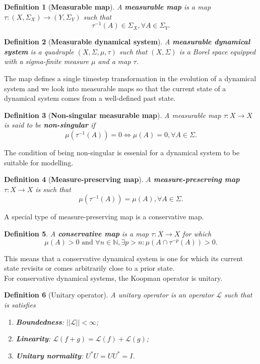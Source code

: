 \documentclass[]{article}
\newtheorem{definition}{Definition}
\begin{document}
\begin{definition}[\textbf{Measurable map}]
A \textbf{measurable map} is a map $\tau: (X,\Sigma_X) \to (Y, \Sigma_Y)$ such that 
\begin{equation}
	\tau^{-1}(A) \in \Sigma_X, \forall A \in \Sigma_Y.
\end{equation}
\end{definition}
\begin{definition}[\textbf{Measurable dynamical system}]
A \textbf{measurable dynamical system} is a quadruple $(X,\Sigma,\mu,\tau)$ such that $(X,\Sigma)$ is a Borel space equipped with a sigma-finite measure $\mu$ and a map $\tau$.
\end{definition}
The map defines a single timestep transformation in the evolution of a dynamical system and we look into measurable maps so that the current state of a dynamical system comes from a well-defined past state.
\begin{definition}[\textbf{Non-singular measurable map}]
A measurable map $\tau:X \to X$ is said to be \textbf{non-singular} if 
\begin{equation}
	\mu(\tau^{-1}(A))=0 \iff \mu(A)=0, \forall A \in \Sigma.
\end{equation}
\end{definition}
The condition of being non-singular is essenial for a dynamical system to be suitable for modelling.
\begin{definition}[\textbf{Measure-preserving map}]
A \textbf{measure-preserving map} $\tau:X \to X$ is such that
\begin{equation}
	\mu(\tau^{-1}(A))=\mu(A), \forall A \in \Sigma.
\end{equation}
\end{definition}
A special type of measure-preserving map is a conservative map.
\begin{definition}
A \textbf{conservative map} is a map $\tau:X \to X$ for which
\begin{equation}
	\mu(A) > 0 \,\, \text{and} \,\, \forall n \in \mathbb{N}, \exists p > n: \mu(A \cap \tau^{-p}(A)) > 0.
\end{equation}
\end{definition}
This means that a conservative dynamical system is one for which its current state revisits or comes arbitrarily close to a prior state. \\
For conservative dynamical systems, the Koopman operator is unitary.
\begin{definition}[Unitary operator]
A unitary operator is an operator $\mathcal{L}$ such that is satisfies
\begin{enumerate}
	\item \textbf{Boundedness}: $||\mathcal{L}||<\infty$;
	\item \textbf{Linearity}: $\mathcal{L}(f+g)=\mathcal{L}(f)+\mathcal{L}(g)$;
	\item \textbf{Unitary normality}: $U^*U=UU^*=I$.
\end{enumerate}
\end{definition}
\end{document}
